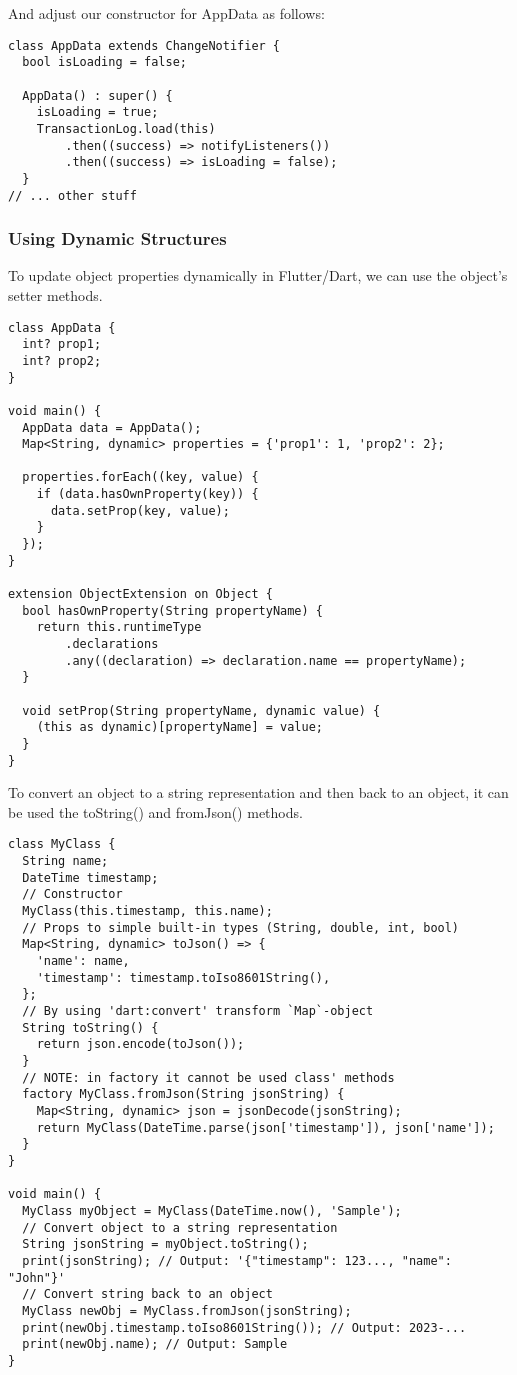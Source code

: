 And adjust our constructor for AppData as follows:

\begin{lstlisting}
class AppData extends ChangeNotifier {
  bool isLoading = false;

  AppData() : super() {
    isLoading = true;
    TransactionLog.load(this)
        .then((success) => notifyListeners())
        .then((success) => isLoading = false);
  }
// ... other stuff
\end{lstlisting}


\subsubsection{Using Dynamic Structures}

To update object properties dynamically in Flutter/Dart, we can use the object's setter methods.

\begin{lstlisting}
class AppData {
  int? prop1;
  int? prop2;
}

void main() {
  AppData data = AppData();
  Map<String, dynamic> properties = {'prop1': 1, 'prop2': 2};

  properties.forEach((key, value) {
    if (data.hasOwnProperty(key)) {
      data.setProp(key, value);
    }
  });
}

extension ObjectExtension on Object {
  bool hasOwnProperty(String propertyName) {
    return this.runtimeType
        .declarations
        .any((declaration) => declaration.name == propertyName);
  }

  void setProp(String propertyName, dynamic value) {
    (this as dynamic)[propertyName] = value;
  }
}
\end{lstlisting}

To convert an object to a string representation and then back to an object, it can be used the toString() 
and fromJson() methods. 

\begin{lstlisting}
class MyClass {
  String name;
  DateTime timestamp;
  // Constructor
  MyClass(this.timestamp, this.name);
  // Props to simple built-in types (String, double, int, bool)
  Map<String, dynamic> toJson() => {
    'name': name,
    'timestamp': timestamp.toIso8601String(),
  };
  // By using 'dart:convert' transform `Map`-object
  String toString() {
    return json.encode(toJson());
  }
  // NOTE: in factory it cannot be used class' methods
  factory MyClass.fromJson(String jsonString) {
    Map<String, dynamic> json = jsonDecode(jsonString);
    return MyClass(DateTime.parse(json['timestamp']), json['name']);
  }
}

void main() {
  MyClass myObject = MyClass(DateTime.now(), 'Sample');
  // Convert object to a string representation
  String jsonString = myObject.toString();
  print(jsonString); // Output: '{"timestamp": 123..., "name": "John"}'
  // Convert string back to an object
  MyClass newObj = MyClass.fromJson(jsonString);
  print(newObj.timestamp.toIso8601String()); // Output: 2023-...
  print(newObj.name); // Output: Sample
}
\end{lstlisting}

